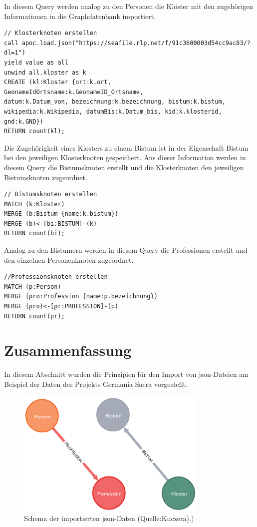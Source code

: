\documentclass[ngerman,]{scrreprt}
\begin{document}
In diesem Query werden analog zu den Personen die Klöster mit den zugehörigen Informationen in die Graphdatenbank importiert.

\begin{verbatim}
// Klosterknoten erstellen
call apoc.load.json("https://seafile.rlp.net/f/91c3600003d54cc9ac83/?dl=1")
yield value as all
unwind all.kloster as k
CREATE (kl:Kloster {ort:k.ort,
GeonameIdOrtsname:k.GeonameID_Ortsname,
datum:k.Datum_von, bezeichnung:k.bezeichnung, bistum:k.bistum,
wikipedia:k.Wikipedia, datumBis:k.Datum_bis, kid:k.klosterid, gnd:k.GND})
RETURN count(kl);
\end{verbatim}

Die Zugehörigkeit eines Klosters zu einem Bistum ist in der Eigenschaft Bistum bei den jeweiligen Klosterknoten gespeichert. Aus dieser Information werden in diesem Query die Bistumsknoten erstellt und die Klosterknoten den jeweiligen Bistumsknoten zugeordnet.

\begin{verbatim}
// Bistumsknoten erstellen
MATCH (k:Kloster)
MERGE (b:Bistum {name:k.bistum})
MERGE (b)<-[bi:BISTUM]-(k)
RETURN count(bi);
\end{verbatim}

Analog zu den Bistumern werden in diesem Query die Professionen erstellt und den einzelnen Personenknoten zugeordnet.

\begin{verbatim}
//Professionsknoten erstellen
MATCH (p:Person)
MERGE (pro:Profession {name:p.bezeichnung})
MERGE (pro)<-[pr:PROFESSION]-(p)
RETURN count(pr);
\end{verbatim}

\section{Zusammenfassung}\label{zusammenfassung-7}

In diesem Abschnitt wurden die Prinzipien für den Import von json-Dateien am Beispiel der Daten des Projekts Germania Sacra vorgestellt.

\begin{figure}
\centering
\includegraphics{Bilder/GS-Schema1.png}
\caption{Schema der importierten json-Daten (Quelle:Kuczera).)}
\end{figure}
\end{document}
